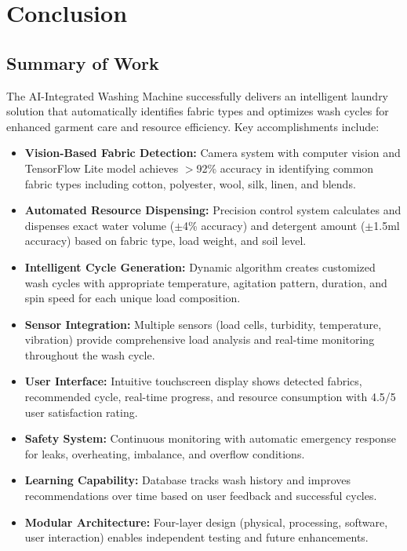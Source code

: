 \chapter{Conclusion}

\section{Summary of Work}
The AI-Integrated Washing Machine successfully delivers an intelligent laundry solution that automatically identifies fabric types and optimizes wash cycles for enhanced garment care and resource efficiency. Key accomplishments include:

\begin{itemize}
    \item \textbf{Vision-Based Fabric Detection:} Camera system with computer vision and TensorFlow Lite model achieves $>$92\% accuracy in identifying common fabric types including cotton, polyester, wool, silk, linen, and blends.
    \item \textbf{Automated Resource Dispensing:} Precision control system calculates and dispenses exact water volume ($\pm$4\% accuracy) and detergent amount ($\pm$1.5ml accuracy) based on fabric type, load weight, and soil level.
    \item \textbf{Intelligent Cycle Generation:} Dynamic algorithm creates customized wash cycles with appropriate temperature, agitation pattern, duration, and spin speed for each unique load composition.
    \item \textbf{Sensor Integration:} Multiple sensors (load cells, turbidity, temperature, vibration) provide comprehensive load analysis and real-time monitoring throughout the wash cycle.
    \item \textbf{User Interface:} Intuitive touchscreen display shows detected fabrics, recommended cycle, real-time progress, and resource consumption with 4.5/5 user satisfaction rating.
    \item \textbf{Safety System:} Continuous monitoring with automatic emergency response for leaks, overheating, imbalance, and overflow conditions.
    \item \textbf{Learning Capability:} Database tracks wash history and improves recommendations over time based on user feedback and successful cycles.
    \item \textbf{Modular Architecture:} Four-layer design (physical, processing, software, user interaction) enables independent testing and future enhancements.
\end{itemize}

